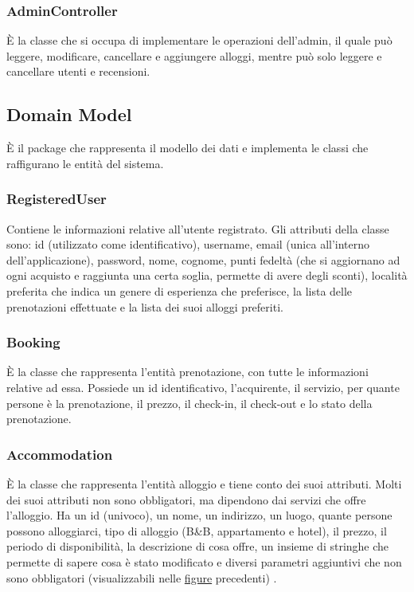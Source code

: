 \documentclass[10pt]{article}
\begin{document}
\subsubsection{AdminController}

\`E la classe che si occupa di implementare le operazioni dell'admin, il quale pu\`o leggere, modificare, cancellare e aggiungere alloggi, mentre pu\`o solo leggere e cancellare utenti e recensioni.
 
\subsection{Domain Model}

\`E il package che rappresenta il modello dei dati e implementa le classi che raffigurano le entit\`a del sistema.

\subsubsection{RegisteredUser}

Contiene le informazioni relative all'utente registrato. Gli attributi della classe sono: id (utilizzato come identificativo), username, email (unica all'interno dell'applicazione), password, nome, cognome, punti fedelt\`a (che si aggiornano ad ogni acquisto e raggiunta una certa soglia, permette di avere degli sconti), localit\`a preferita che indica un genere di esperienza che preferisce, la lista delle prenotazioni effettuate e la lista dei suoi alloggi preferiti. 

\subsubsection{Booking}

\`E la classe che rappresenta l'entit\`a prenotazione, con tutte le informazioni relative ad essa. Possiede un id identificativo, l'acquirente, il servizio, per quante persone \`e la prenotazione, il prezzo, il check-in, il check-out e lo stato della prenotazione.

\subsubsection{Accommodation}

\`E la classe che rappresenta l'entit\`a alloggio e tiene conto dei suoi attributi. Molti dei suoi attributi non sono obbligatori, ma dipendono dai servizi che offre l'alloggio. Ha un id (univoco), un nome, un indirizzo, un luogo, quante persone possono alloggiarci, tipo di alloggio (B\&B, appartamento e hotel), il prezzo, il periodo di disponibilit\`a, la descrizione di cosa offre, un insieme di stringhe che permette di sapere cosa \`e stato modificato e diversi parametri aggiuntivi che non sono obbligatori (visualizzabili nelle \hyperref[domainmodel]{figure} precedenti) .
\end{document}
